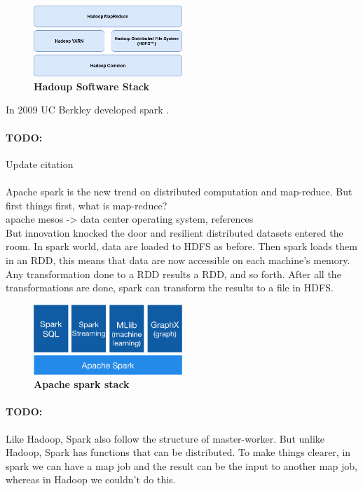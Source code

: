 \begin{figure}[h]
	\centering
	\includegraphics[width=0.5\textwidth]{images/hadoop-stack.png}
	\caption{\bfseries Hadoup Software Stack}
	\label{hadoopStack}
\end{figure}


 In 2009 UC Berkley developed spark \cite{DatabricsSpark:8}. \paragraph{TODO:} Update citation

\paragraph{}Apache spark is the new trend on distributed computation and map-reduce. 
But first things first, what is map-reduce? \\
apache mesos -> data center operating system, references
\\
But innovation knocked the door and resilient distributed datasets entered the room. In spark world, data are loaded to HDFS as before. Then spark loads them in an RDD, this means that data are now accessible on each machine's memory. Any transformation done to a RDD results a RDD, and so forth. After all the transformations are done, spark can transform the results to a file in HDFS.

\begin{figure}[ht]
  \centering
    \includegraphics[width=0.5\textwidth]{images/spark-stack.png}
    \caption{\bfseries Apache spark stack \cite{ApacheSpark:1}}
   \label{apacheSparkStack}
\end{figure}


\paragraph{TODO:} Like Hadoop, Spark also follow the structure of master-worker. But unlike Hadoop, Spark has functions that can be distributed. To make things clearer, in spark we can have a map job and the result can be the input to another map job, whereas in Hadoop we couldn't do this.

